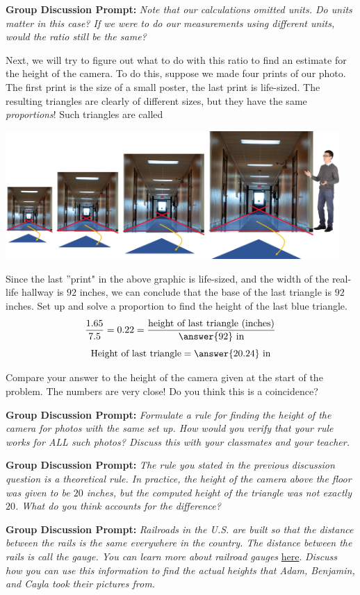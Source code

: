 \documentclass{ximera}
\begin{document}
\begin{exploration}
\textbf{Group Discussion Prompt:}
    \emph{Note that our calculations omitted units.  Do units matter in this case?  If we were to do our measurements using different units, would the ratio still be the same?} 

Next, we will try to figure out what to do with this ratio to find an estimate for the height of the camera.  To do this, suppose we made four prints of our photo.  The first print is the size of a small poster, the last print is life-sized.  The resulting triangles are clearly of different sizes, but they have the same \emph{proportions}!  Such triangles are called 

\begin{image}
         \includegraphics[width=5in]{similarHallways.jpg}
\end{image}

    Since the last ''print" in the above graphic is life-sized, and the width of the real-life hallway is $92$ inches, we can conclude that the base of the last triangle is $92$ inches. 
    Set up and solve a proportion to find the height of the last blue triangle.  
    $$\frac{1.65}{7.5}=0.22=\frac{\text{height of last triangle (inches)}}{\answer{92}~\text{in}}$$
    $$\text{Height of last triangle}=\answer{20.24}~\text{in}$$

   Compare your answer to the height of the camera given at the start of the problem.  The numbers are very close!  Do you think this is a coincidence? 

\textbf{Group Discussion Prompt:}
    \emph{Formulate a rule for finding the height of the camera for photos with the same set up.  How would you verify that your rule works for ALL such photos?  Discuss this with your classmates and your teacher.}
    
\textbf{Group Discussion Prompt:}
    \emph{The rule you stated in the previous discussion question is a theoretical rule.  In practice, the height of the camera above the floor was given to be $20$ inches, but the computed height of the triangle was not exactly $20$.  What do you think accounts for the difference?}  

\textbf{Group Discussion Prompt:}
    \emph{Railroads in the U.S. are built so that the distance between the rails is the same everywhere in the country.  The distance between the rails is call the gauge.  You can learn more about railroad gauges} \href{https://en.wikipedia.org/wiki/Track_gauge}{here}. \emph{Discuss how you can use this information to find the actual heights that Adam, Benjamin, and Cayla took their pictures from.}  
    
\end{exploration}
\end{document}
